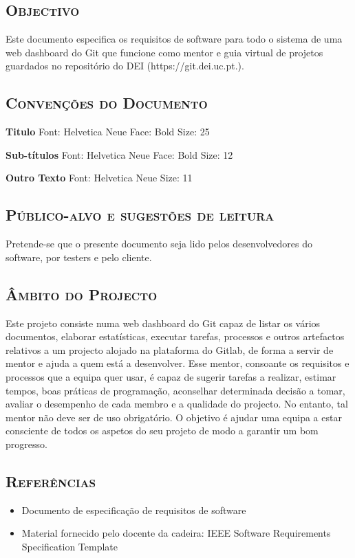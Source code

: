 \documentclass[12pt]{article}
\begin{document}
\subsection{ \textsc{Objectivo}}
Este documento especifica os requisitos de software para todo o sistema de uma web dashboard do Git que funcione como mentor e guia virtual de projetos guardados no repositório do DEI (https://git.dei.uc.pt.).

\subsection{ \textsc{Convenções do Documento}}
\textbf{Titulo}
Font: Helvetica Neue
Face: Bold
Size: 25

\textbf{Sub-títulos}
Font: Helvetica Neue
Face: Bold
Size: 12

\textbf{Outro Texto}
Font: Helvetica Neue
Size: 11

\subsection{ \textsc{Público-alvo e sugestões de leitura}}
Pretende-se que o presente documento seja lido pelos desenvolvedores do software, por testers e pelo cliente.

\subsection{ \textsc{Âmbito do Projecto}}
Este projeto consiste numa web dashboard do Git capaz de listar os vários documentos, elaborar estatísticas, executar tarefas, processos e outros artefactos relativos a um projecto alojado na plataforma do Gitlab, de forma a servir de mentor e ajuda a quem está a desenvolver. Esse mentor, consoante os requisitos e processos que a equipa quer usar, é capaz de sugerir tarefas a realizar, estimar tempos, boas práticas de programação, aconselhar determinada decisão a tomar, avaliar o desempenho de cada membro e a qualidade do projecto. No entanto, tal mentor não deve ser de uso obrigatório. O objetivo é ajudar uma equipa a estar consciente de todos os aspetos do seu projeto de modo a garantir um bom progresso.

\subsection{ \textsc{Referências}}
\begin{itemize}
\item Documento de especificação de requisitos de software
\item Material fornecido pelo docente da cadeira: IEEE Software Requirements Specification Template 
\end{itemize}
\end{document}

